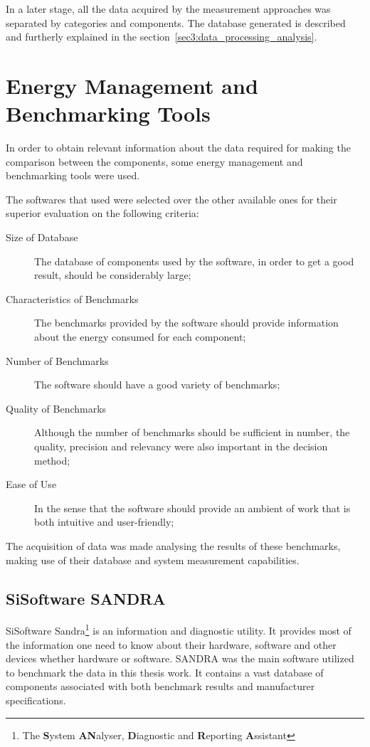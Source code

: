    In a later stage, all the data acquired by the measurement approaches was separated by categories and components. The database generated is described and furtherly explained in the section~\ref{sec3:data_processing_analysis}.
    
\section{Energy Management and Benchmarking Tools} \label{sec3:energy_management_tools}
    In order to obtain relevant information about the data required for making the comparison between the components, some energy management and benchmarking tools were used.
    
    The softwares that used were selected over the other available ones for their superior evaluation on the following criteria:
\begin{description}
    \item[Size of Database] The database of components used by the software, in order to get a good result, should be considerably large;
    \item[Characteristics of Benchmarks] The benchmarks provided by the software should provide information about the energy consumed for each component;
    \item[Number of Benchmarks] The software should have a good variety of benchmarks;
    \item[Quality of Benchmarks] Although the number of benchmarks should be sufficient in number, the quality, precision and relevancy were also important in the decision method;
    \item[Ease of Use] In the sense that the software should provide an ambient of work that is both intuitive and user-friendly;
\end{description}
    
    The acquisition of data was made analysing the results of these benchmarks, making use of their database and system measurement capabilities.

    \subsection{SiSoftware SANDRA} \label{sec3:sandra}

    SiSoftware Sandra\footnote{The \textbf{S}ystem \textbf{AN}alyser, \textbf{D}iagnostic and \textbf{R}eporting \textbf{A}ssistant} is an information and diagnostic utility. It provides most of the information one need to know about their hardware, software and other devices whether hardware or software. SANDRA was the main software utilized to benchmark the data in this thesis work. It contains a vast database of components associated with both benchmark results and manufacturer specifications.
    
